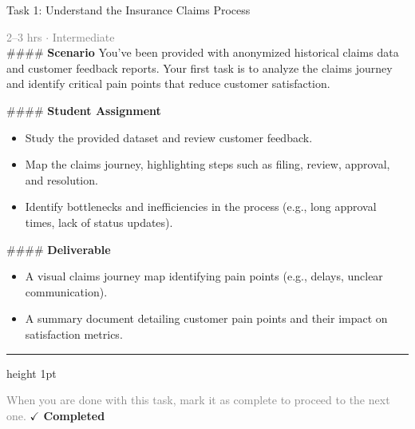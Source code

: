 \documentclass[10pt,a4paper]{article}
\begin{document}
\begin{taskbox}{Task 1: Understand the Insurance Claims Process}

    {\small \textcolor{gray}{2--3 hrs $\cdot$ Intermediate}}\\[12pt]

    \#\#\#\# \textbf{Scenario}  
You’ve been provided with anonymized historical claims data and customer feedback reports. Your first task is to analyze the claims journey and identify critical pain points that reduce customer satisfaction.  

\#\#\#\# \textbf{Student Assignment}  
\begin{itemize}
    \item Study the provided dataset and review customer feedback.  
    \item Map the claims journey, highlighting steps such as filing, review, approval, and resolution.  
    \item Identify bottlenecks and inefficiencies in the process (e.g., long approval times, lack of status updates).  
\end{itemize}

\#\#\#\# \textbf{Deliverable}  
\begin{itemize}
    \item A visual claims journey map identifying pain points (e.g., delays, unclear communication).  
    \item A summary document detailing customer pain points and their impact on satisfaction metrics.\par
\end{itemize}

    \vspace{16pt}

    \textcolor{cardBorder}{\hrule height 1pt}\vspace{8pt}

    \small \textcolor{gray}{When you are done with this task, mark it as complete to proceed to the next one.} \hfill \textbf{\textcolor{brandDark}{$\checkmark$ Completed}}

\end{taskbox}
\end{document}
